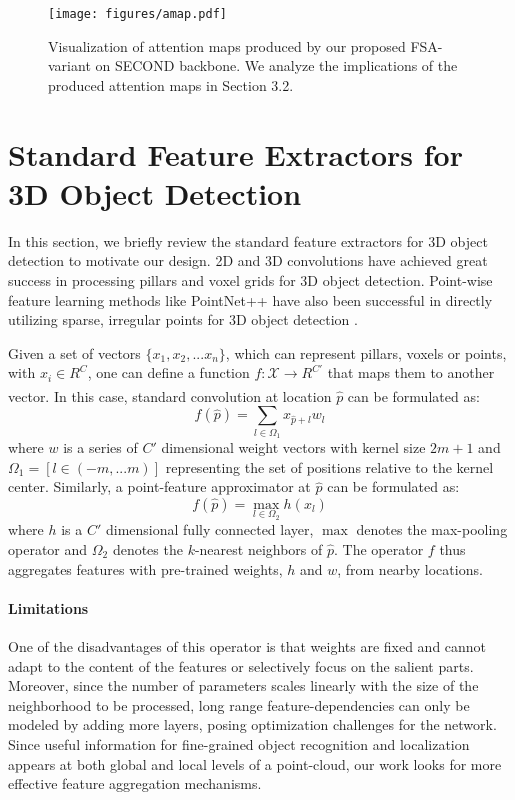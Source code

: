 \documentclass[10pt,twocolumn,letterpaper]{article}
\begin{document}
\begin{figure*}[h]
    \centering
    \texttt{[image: figures/amap.pdf]}
    \caption{Visualization of attention maps produced by our proposed FSA-variant on SECOND \cite{SECOND} backbone. We analyze the implications of the produced attention maps in Section 3.2.}
    \label{fig:vis_attn}
\end{figure*}
 \section{Standard Feature Extractors for 3D Object Detection}
In this section, we briefly review the standard feature extractors for 3D object detection to motivate our design. 2D and 3D convolutions have achieved great success in processing pillars \cite{pointpillars} and voxel grids \cite{SECOND} for 3D object detection. Point-wise feature learning methods like PointNet++ \cite{pointnetplusplus} have also been successful in directly utilizing sparse, irregular points for 3D object detection \cite{PointRCNN}. 

Given a set of vectors $\{x_1, x_2,...x_n\}$, which can represent pillars, voxels or points, with $x_i \in R^C$, one can define a function $f:\mathcal{X} \xrightarrow[]{} R^{C'}$ that maps them to another vector. In this case, standard convolution at location $\hat{p}$ can be formulated as:
\begin{equation}
f(\hat{p}) = \sum_{l\in\Omega_1}x_{\hat{p}+l}w_l
\end{equation}
where $w$ is a series of $C'$ dimensional weight vectors with kernel size $2m+1$ and $\Omega_{1}=[l\in(-m,...m)]$ representing the set of positions relative to the kernel center. Similarly, a point-feature approximator at $\hat{p}$ can be formulated as:
\begin{equation}
f(\hat{p}) = \max_{l\in\Omega_2}h(x_l)
\end{equation}
where $h$ is a $C'$ dimensional fully connected layer, $\max$ denotes the max-pooling operator and $\Omega_2$ denotes the $k$-nearest neighbors of $\hat{p}$. 
The operator $f$ thus aggregates features with pre-trained weights, $h$ and $w$, from nearby locations.

\paragraph{Limitations}  One of the disadvantages of this operator is that weights are fixed and cannot adapt to the content of the features or selectively focus on the salient parts. Moreover, since the number of parameters scales linearly with the size of the neighborhood to be processed, long range feature-dependencies can only be modeled by adding more layers, posing optimization challenges for the network. Since useful information for fine-grained object recognition and localization appears at both global and local levels of a point-cloud, our work looks for more effective feature aggregation mechanisms.
 
\end{document}

